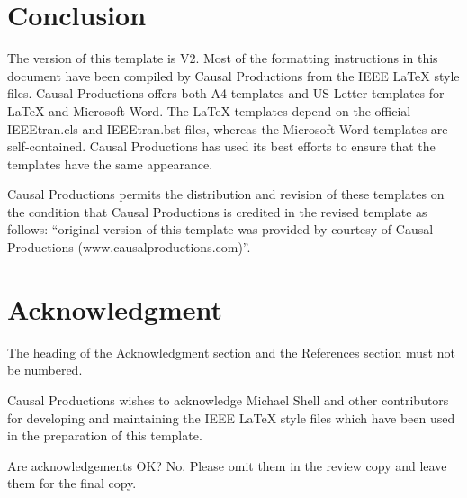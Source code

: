 \documentclass[10pt,conference,a4paper]{IEEEtran}
\begin{document}
\section{Conclusion}

The version of this template is V2.  Most of the formatting
instructions in this document have been compiled by Causal Productions
from the IEEE LaTeX style files.  Causal Productions offers both A4
templates and US Letter templates for LaTeX and Microsoft Word.  The
LaTeX templates depend on the official IEEEtran.cls and IEEEtran.bst
files, whereas the Microsoft Word templates are self-contained.
Causal Productions has used its best efforts to ensure that the
templates have the same appearance.

Causal Productions permits the distribution and revision of these
templates on the condition that Causal Productions is credited in the
revised template as follows: ``original version of this template was
provided by courtesy of Causal Productions
(www.causalproductions.com)''.

\vfill\eject

\section*{Acknowledgment}

The heading of the Acknowledgment section and the References section
must not be numbered.

Causal Productions wishes to acknowledge Michael Shell and other
contributors for developing and maintaining the IEEE LaTeX style files
which have been used in the preparation of this template. 

Are acknowledgements OK? No. Please omit them in the review copy 
and leave them for the final copy.




\end{document}
